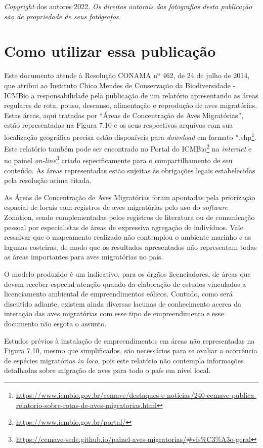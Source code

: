 \documentclass[
  oneside]{scrbook}
\DeclareRobustCommand{\href}[2]{#2\footnote{\url{#1}}}
\begin{document}
\emph{Copyright} dos autores 2022. \emph{Os direitos autorais das fotografias desta publicação são de propriedade de seus fotógrafos.}

\hypertarget{como-utilizar}{%
\chapter*{Como utilizar essa publicação}\label{como-utilizar}}


Este documento atende à Resolução CONAMA nº 462, de 24 de julho de 2014, que atribui ao Instituto Chico Mendes de Conservação da Biodiversidade - ICMBio a responsabilidade pela publicação de um relatório apresentando as áreas regulares de rota, pouso, descanso, alimentação e reprodução de aves migratórias. Estas áreas, aqui tratadas por ``Áreas de Concentração de Aves Migratórias'', estão representadas na Figura 7.10 e os seus respectivos arquivos com sua localização geográfica precisa estão \href{https://www.icmbio.gov.br/cemave/destaques-e-noticias/240-cemave-publica-relatorio-sobre-rotas-de-aves-migratorias.html}{disponíveis para \emph{download} em formato *.shp}. Este relatório também pode ser encontrado no \href{https://www.icmbio.gov.br/portal/}{Portal do ICMBio} na \emph{internet} e no \href{https://cemave-sede.github.io/painel-aves-migratorias/\#vis\%C3\%A3o-geral}{painel \emph{on-line}} criado especificamente para o compartilhamento de seu conteúdo. As áreas representadas estão sujeitas às obrigações legais estabelecidas pela resolução acima citada.

As Áreas de Concentração de Aves Migratórias foram apontadas pela priorização espacial de locais com registros de aves migratórias pelo uso do \emph{software} Zonation, sendo complementadas pelos registros de literatura ou de comunicação pessoal por especialistas de áreas de expressiva agregação de indivíduos. Vale ressalvar que o mapeamento realizado não contemplou o ambiente marinho e as lagunas costeiras, de modo que os resultados apresentados não representam todas as áreas importantes para aves migratórias no país.

O modelo produzido é um indicativo, para os órgãos licenciadores, de áreas que devem receber especial atenção quando da elaboração de estudos vinculados a licenciamento ambiental de empreendimentos eólicos. Contudo, como será discutido adiante, existem ainda diversas lacunas de conhecimento acerca da interação das aves migratórias com esse tipo de empreendimento e esse documento não esgota o assunto.

Estudos prévios à instalação de empreendimentos em áreas não representadas na Figura 7.10, mesmo que simplificados, são necessários para se avaliar a ocorrência de espécies migratórias \emph{in loco}, pois este relatório não contempla informações detalhadas sobre migração de aves para todo o país em nível local.
\end{document}
